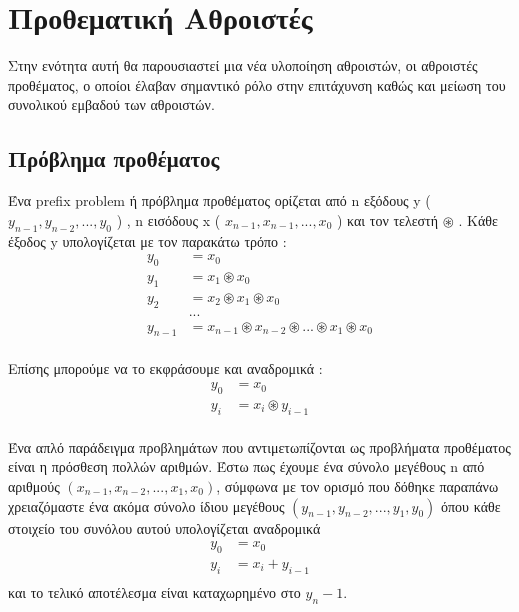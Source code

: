 \section{Προθεματική Αθροιστές}
Στην ενότητα αυτή θα παρουσιαστεί μια νέα υλοποίηση αθροιστών, οι αθροιστές προθέματος,
ο οποίοι έλαβαν σημαντικό ρόλο στην επιτάχυνση καθώς και μείωση του συνολικού εμβαδού 
των αθροιστών. 





\subsection{Πρόβλημα προθέματος}

Ένα prefix problem ή πρόβλημα προθέματος 
ορίζεται από n εξόδους y ( $y_{n-1},y_{n-2}, ... ,y_0 $ ) , n εισόδους x ( $x_{n-1},x_{n-1}, ... ,x_0 $ ) και τον τελεστή $\circledast$ .
Κάθε έξοδος y υπολογίζεται με τον παρακάτω τρόπο :
\begin{equation}
\begin{split}
y_0 &= x_0\\
y_1 &= x_1 \circledast x_0\\
y_2 &= x_2 \circledast x_1 \circledast x_0\\
&...\\
y_{n-1} &= x_{n-1} \circledast x_{n-2} \circledast ... \circledast x_{1} \circledast x_0\\
\end{split}
\end{equation}

Επίσης μπορούμε να το εκφράσουμε και αναδρομικά :
\begin{equation}
\begin{split}
y_0 &= x_0\\
y_{i} &= x_{i} \circledast y_{i-1}\\
\end{split}
\end{equation}

Ένα απλό παράδειγμα προβλημάτων που αντιμετωπίζονται ως προβλήματα προθέματος είναι 
η πρόσθεση πολλών αριθμών. Έστω πως έχουμε ένα σύνολο μεγέθους n από αριθμούς 
$(x_{n-1},x_{n-2}, ... ,x_1,x_0)$, σύμφωνα με τον ορισμό που δόθηκε παραπάνω
χρειαζόμαστε ένα ακόμα σύνολο ίδιου μεγέθους $(y_{n-1},y_{n-2}, ... ,y_1,y_0)$ 
όπου κάθε στοιχείο του συνόλου αυτού υπολογίζεται αναδρομικά
\begin{equation*}
\begin{split}
y_0 &= x_0\\
y_{i} &= x_{i} + y_{i-1}\\
\end{split}
\end{equation*}
και το τελικό αποτέλεσμα είναι καταχωρημένο στο $y_n-1$.

